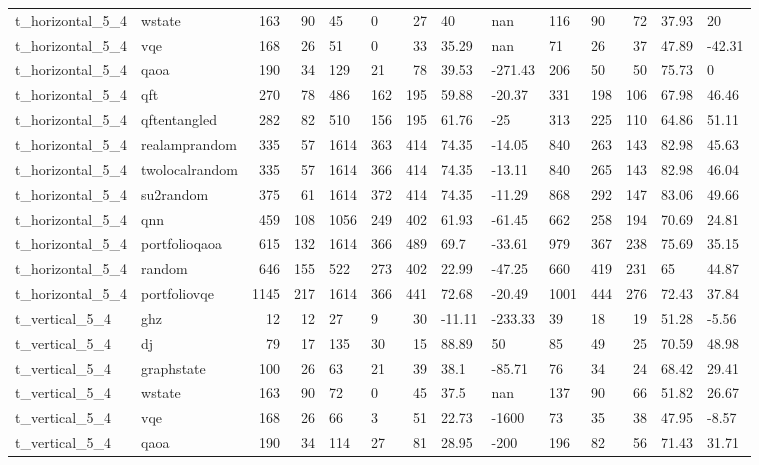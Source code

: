\begin{longtable}{llrrllrllllrll}
t\_horizontal\_5\_4 & wstate & 163 & 90 & 45 & 0 & 27 & 40 & nan & 116 & 90 & 72 & 37.93 & 20 \\
t\_horizontal\_5\_4 & vqe & 168 & 26 & 51 & 0 & 33 & 35.29 & nan & 71 & 26 & 37 & 47.89 & -42.31 \\
t\_horizontal\_5\_4 & qaoa & 190 & 34 & 129 & 21 & 78 & 39.53 & -271.43 & 206 & 50 & 50 & 75.73 & 0 \\
t\_horizontal\_5\_4 & qft & 270 & 78 & 486 & 162 & 195 & 59.88 & -20.37 & 331 & 198 & 106 & 67.98 & 46.46 \\
t\_horizontal\_5\_4 & qftentangled & 282 & 82 & 510 & 156 & 195 & 61.76 & -25 & 313 & 225 & 110 & 64.86 & 51.11 \\
t\_horizontal\_5\_4 & realamprandom & 335 & 57 & 1614 & 363 & 414 & 74.35 & -14.05 & 840 & 263 & 143 & 82.98 & 45.63 \\
t\_horizontal\_5\_4 & twolocalrandom & 335 & 57 & 1614 & 366 & 414 & 74.35 & -13.11 & 840 & 265 & 143 & 82.98 & 46.04 \\
t\_horizontal\_5\_4 & su2random & 375 & 61 & 1614 & 372 & 414 & 74.35 & -11.29 & 868 & 292 & 147 & 83.06 & 49.66 \\
t\_horizontal\_5\_4 & qnn & 459 & 108 & 1056 & 249 & 402 & 61.93 & -61.45 & 662 & 258 & 194 & 70.69 & 24.81 \\
t\_horizontal\_5\_4 & portfolioqaoa & 615 & 132 & 1614 & 366 & 489 & 69.7 & -33.61 & 979 & 367 & 238 & 75.69 & 35.15 \\
t\_horizontal\_5\_4 & random & 646 & 155 & 522 & 273 & 402 & 22.99 & -47.25 & 660 & 419 & 231 & 65 & 44.87 \\
t\_horizontal\_5\_4 & portfoliovqe & 1145 & 217 & 1614 & 366 & 441 & 72.68 & -20.49 & 1001 & 444 & 276 & 72.43 & 37.84 \\
t\_vertical\_5\_4 & ghz & 12 & 12 & 27 & 9 & 30 & -11.11 & -233.33 & 39 & 18 & 19 & 51.28 & -5.56 \\
t\_vertical\_5\_4 & dj & 79 & 17 & 135 & 30 & 15 & 88.89 & 50 & 85 & 49 & 25 & 70.59 & 48.98 \\
t\_vertical\_5\_4 & graphstate & 100 & 26 & 63 & 21 & 39 & 38.1 & -85.71 & 76 & 34 & 24 & 68.42 & 29.41 \\
t\_vertical\_5\_4 & wstate & 163 & 90 & 72 & 0 & 45 & 37.5 & nan & 137 & 90 & 66 & 51.82 & 26.67 \\
t\_vertical\_5\_4 & vqe & 168 & 26 & 66 & 3 & 51 & 22.73 & -1600 & 73 & 35 & 38 & 47.95 & -8.57 \\
t\_vertical\_5\_4 & qaoa & 190 & 34 & 114 & 27 & 81 & 28.95 & -200 & 196 & 82 & 56 & 71.43 & 31.71 \\

\end{longtable}
